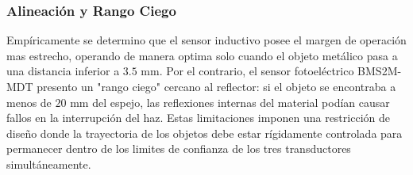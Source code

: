 \documentclass[conference]{IEEEtran}
\begin{document}
\subsubsection{Alineación y Rango Ciego}
Empíricamente se determino que el sensor inductivo posee el margen de operación mas estrecho, operando de manera optima solo cuando el objeto metálico pasa a una distancia inferior a $3.5$ mm. Por el contrario, el sensor fotoeléctrico  BMS2M-MDT presento un "rango ciego" cercano al reflector: si el objeto se encontraba a menos de $20$ mm del espejo, las reflexiones internas del material podían causar fallos en la interrupción del haz. Estas limitaciones imponen una restricción de diseño donde la trayectoria de los objetos debe estar rígidamente controlada para permanecer dentro de los limites de confianza de los tres transductores simultáneamente.
\end{document}
